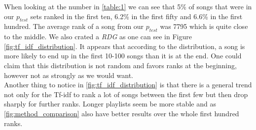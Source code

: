 When looking at the number in \ref{table:1} we can see that 5\% of songs that were in our $p_{test}$ sets ranked in the first ten, 6.2\% in the first fifty and 6.6\% in the first hundred. The average rank of a song from our $p_{test}$ was 7795 which is quite close to the middle. We also crated a \textit{RDG} as one can see in Figure \ref{fig:tf_idf_distribution}. It appears that according to the distribution, a song is more likely to end up in the first 10-100 songs than it is at the end. One could claim that this distribution is not random and favors ranks at the beginning, however not as strongly as we would want.\\
Another thing to notice in \ref{fig:tf_idf_distribution} is that there is a general trend not only for the Tf-idf to rank a lot of songs between the first few but then drop sharply for further ranks. Longer playlists seem be more stable and as \ref{fig:method_comparison} also have better results over the whole first hundred ranks.

